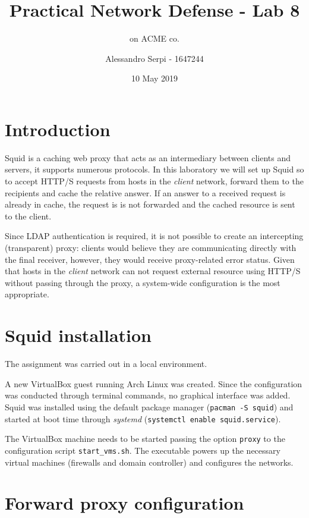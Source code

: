 \documentclass{homework}
\title{Practical Network Defense - Lab 8}
\subtitle{\sq on ACME co.}
\author{Alessandro Serpi - 1647244}
\date{10 May 2019}
\newcommand{\sq}{Squid\xspace}
\newcommand{\vb}{VirtualBox\xspace}
\begin{document}
    \maketitle
    \tableofcontents
    
    
    \pagebreak
    \section{Introduction}
    \sq is a caching web proxy that acts as an intermediary between clients and servers, it supports numerous protocols.
    In this laboratory we will set up \sq so to accept HTTP/S requests from hosts in the \textit{client} network, forward them to the recipients and cache the relative answer.
    If an answer to a received request is already in cache, the request is is not forwarded and the cached resource is sent to the client.
    
    Since LDAP authentication is required, it is not possible to create an intercepting (transparent) proxy: clients would believe they are communicating directly with the final receiver, however, they would receive proxy-related error status.
    Given that hosts in the \textit{client} network can not request external resource using HTTP/S without passing through the proxy, a system-wide configuration is the most appropriate.
    
    
    \section{\sq installation}
    The assignment was carried out in a local environment.
    
    A new \vb guest running Arch Linux was created.
    Since the configuration was conducted through terminal commands, no graphical interface was added.
    Squid was installed using the default package manager (\texttt{pacman -S squid}) and started at boot time through \textit{systemd} (\texttt{systemctl enable squid.service}).
    
    The \vb machine needs to be started passing the option \texttt{proxy} to the configuration script \texttt{start\_vms.sh}.
    The executable powers up the necessary virtual machines (firewalls and domain controller) and configures the networks.
    
    
    \section{Forward proxy configuration}
\end{document}
